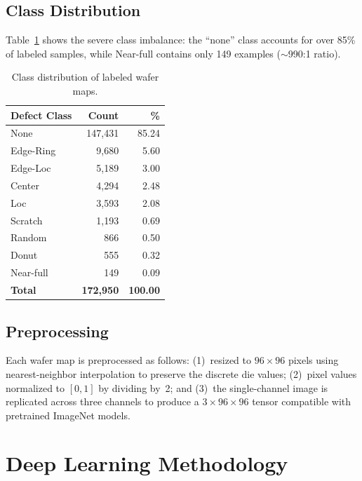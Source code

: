 \documentclass[conference]{IEEEtran}
\begin{document}
\subsection{Class Distribution}

Table~\ref{tab:class_distribution} shows the severe class imbalance: the
``none'' class accounts for over 85\% of labeled samples, while Near-full
contains only 149 examples ($\sim$990:1 ratio).

\begin{table}[H]
\centering
\caption{Class distribution of labeled wafer maps.}
\label{tab:class_distribution}
\begin{tabular}{@{}lrr@{}}
\toprule
\textbf{Defect Class} & \textbf{Count} & \textbf{\%} \\
\midrule
None        & 147{,}431 & 85.24 \\
Edge-Ring   &   9{,}680 &  5.60 \\
Edge-Loc    &   5{,}189 &  3.00 \\
Center      &   4{,}294 &  2.48 \\
Loc         &   3{,}593 &  2.08 \\
Scratch     &   1{,}193 &  0.69 \\
Random      &     866   &  0.50 \\
Donut       &     555   &  0.32 \\
Near-full   &     149   &  0.09 \\
\midrule
\textbf{Total} & \textbf{172{,}950} & \textbf{100.00} \\
\bottomrule
\end{tabular}
\end{table}

\subsection{Preprocessing}

Each wafer map is preprocessed as follows: (1)~resized to $96 \times 96$
pixels using nearest-neighbor interpolation to preserve the discrete die
values; (2)~pixel values normalized to $[0, 1]$ by dividing by~2; and
(3)~the single-channel image is replicated across three channels to produce a
$3 \times 96 \times 96$ tensor compatible with pretrained ImageNet models.

\section{Deep Learning Methodology}
\label{sec:methodology}
\end{document}
